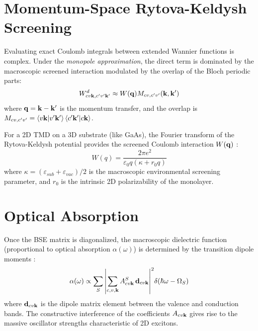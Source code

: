 \documentclass[12pt,a4paper]{article}
\begin{document}
\section{Momentum-Space Rytova-Keldysh Screening}
Evaluating exact Coulomb integrals between extended Wannier functions is complex. Under the \textit{monopole approximation}, the direct term is dominated by the macroscopic screened interaction modulated by the overlap of the Bloch periodic parts:
\begin{equation}
    W^d_{cv\vb{k}, c'v'\vb{k}'} \approx W(\vb{q}) M_{cv, c'v'}(\vb{k}, \vb{k}')
\end{equation}
where $\vb{q} = \vb{k} - \vb{k}'$ is the momentum transfer, and the overlap is $M_{cv, c'v'} = \braket{v\vb{k}}{v'\vb{k}'} \braket{c'\vb{k}'}{c\vb{k}}$.

For a 2D TMD on a 3D substrate (like GaAs), the Fourier transform of the Rytova-Keldysh potential provides the screened Coulomb interaction $W(\vb{q})$ \cite{Rytova1967, Keldysh1979, Cudazzo2011}:
\begin{equation}
    W(q) = \frac{2\pi e^2}{\varepsilon_0 q (\kappa + r_0 q)}
\end{equation}
where $\kappa = (\varepsilon_{sub} + \varepsilon_{vac})/2$ is the macroscopic environmental screening parameter, and $r_0$ is the intrinsic 2D polarizability of the monolayer.

\section{Optical Absorption}
Once the BSE matrix is diagonalized, the macroscopic dielectric function (proportional to optical absorption $\alpha(\omega)$) is determined by the transition dipole moments \cite{HaugKoch2009}:
\begin{equation}
    \alpha(\omega) \propto \sum_S \abs{\sum_{c,v,\vb{k}} A_{cv\vb{k}}^S \, \vb{d}_{cv\vb{k}}}^2 \delta(\hbar\omega - \Omega_S)
\end{equation}
where $\vb{d}_{cv\vb{k}}$ is the dipole matrix element between the valence and conduction bands. The constructive interference of the coefficients $A_{cv\vb{k}}$ gives rise to the massive oscillator strengths characteristic of 2D excitons.
\end{document}
